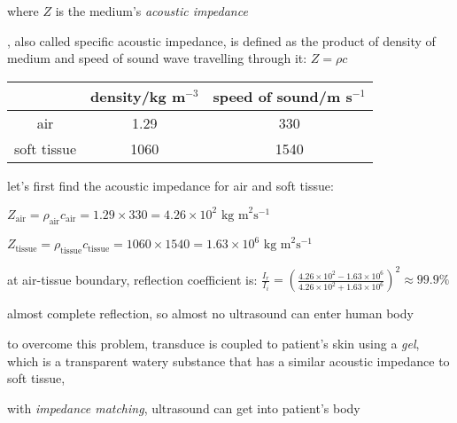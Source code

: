 \noindent where $Z$ is the medium's \emph{acoustic impedance}

\cmt {}, also called specific acoustic impedance, is defined as the product of density of medium and speed of sound wave travelling through it: $\boxed{Z=\rho c}$

\label{ex-air-tissue}

\begin{table}[ht]
	\centering
	\begin{tabular}{|c|c|c|}
		\hline
		& density/kg m$^{-3}$ & speed of sound/m s$^{-1}$ \\ \hline
		air & 1.29 & 330 \\ \hline
		soft tissue & 1060 & 1540 \\ \hline
	\end{tabular}
\end{table}

\sol let's first find the acoustic impedance for air and soft tissue:

\eqskip $Z_\text{air} = \rho_\text{air} c_\text{air} = 1.29 \times 330 = 4.26 \times 10^2 \text{ kg m}^2 \text{s}^{-1}$

\eqskip $Z_\text{tissue} = \rho_\text{tissue} c_\text{tissue} = 1060 \times 1540 = 1.63 \times 10^6 \text{ kg m}^2 \text{s}^{-1}$

at air-tissue boundary, reflection coefficient is: $\frac{I_r}{I_i} = \left(\frac{4.26\times10^2-1.63\times10^6}{4.26\times10^2+1.63\times10^6} \right)^2 \approx 99.9\%$

almost complete reflection, so almost no ultrasound can enter human body

to overcome this problem, transduce is coupled to patient's skin using a \emph{gel}, which is a transparent watery substance that has a similar acoustic impedance to soft tissue,

with \emph{impedance matching}, ultrasound can get into patient's body \eoe


\label{ex-us-transmission}


